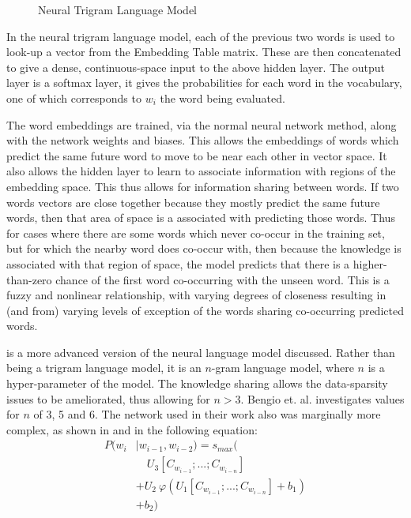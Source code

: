 \documentclass[parskip]{komatufte}
\begin{document}
\begin{figure}
	\centering
	 
	\caption{\label{fig:trigram-neural-language-model} Neural Trigram Language Model}
\end{figure}

In the neural trigram language model, each of the previous two words is used to look-up a vector from the Embedding Table matrix.
These are then concatenated to give a dense, continuous-space input to the above hidden layer.
The output layer is a softmax layer, it gives the probabilities for each word in the vocabulary, one of which corresponds to $w_i$ the word being evaluated.

The word embeddings are trained, via the normal neural network method, along with the network weights and biases.
This allows the embeddings of words which predict the same future word to move to be near each other in vector space.
It also allows the hidden layer to learn to associate information with regions of the embedding space.
This thus allows for information sharing between words.
If two words vectors are close together because they mostly predict the same future words, then that area of space is a associated with predicting those words.
Thus for cases where there are some words which never co-occur in the training set, but for which the nearby word does co-occur with, then because the knowledge is associated with that region of space, the model predicts that there is a higher-than-zero chance of the first word co-occurring with the unseen word.
This is a fuzzy and nonlinear relationship, with varying degrees of closeness resulting in (and from) varying levels of exception of the words sharing co-occurring predicted words.


 is a more advanced version of the neural language model discussed.
Rather than being a trigram language model, it is an $n$-gram language model, where $n$ is a hyper-parameter of the model.
The knowledge sharing allows the data-sparsity issues to be ameliorated, thus allowing for $n>3$.
%
%
Bengio et. al. investigates values for $n$ of 3, 5 and 6.
The network used in their work also was marginally more complex, as shown in  and in the following equation:
\begin{align}
P(w_i & \mid w_{i-1}, w_{i-2}) = s_{max}( \nonumber
\\  & \quad U_3 \left[ C_{w_{i-1}};...; C_{w_{i-n}}\right] \nonumber
\\  & + U_2 \: \varphi\left( U_1\left[C_{w_{i-1}};...; C_{w_{i-n}} \right] + b_1\right) \nonumber
\\  & +b_2)
\end{align}
\end{document}
